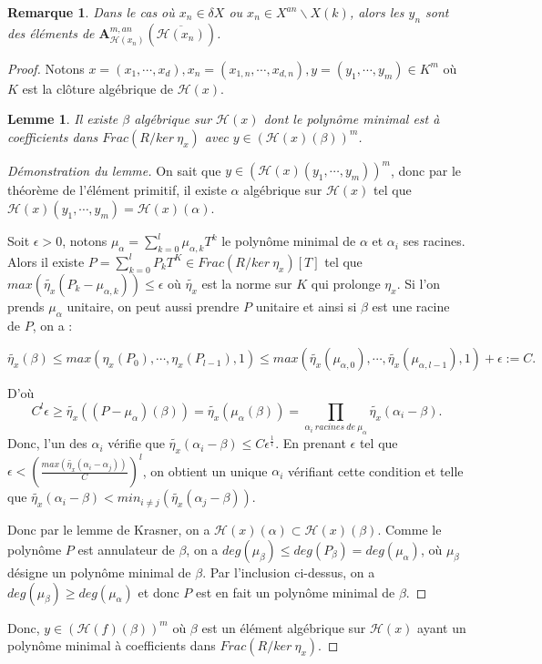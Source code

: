\documentclass[11pt]{article}
\newcommand{\ana}{\mathbf{A}}
\newtheorem{lem}[thm]{Lemme}
\newtheorem{rem}[thm]{Remarque}
\begin{document}
\begin{rem}
Dans le cas où $x_n \in \delta X$ ou $x_n \in X^{an}\backslash X(k)$, alors les $y_n$ sont des éléments de $\ana^{m,an}_{\mathcal{H}(x_n)}(\overline{\mathcal{H}(x_n)})$.
\end{rem}
\begin{proof}
Notons $x= (x_1, \cdots, x_d), x_n = (x_{1,n}, \cdots, x_{d,n}), y = (y_1, \cdots, y_m)\in K^m$ où $K$ est la clôture algébrique de $\mathcal{H}(x)$. 
\begin{lem}
Il existe $\beta$ algébrique sur $\mathcal{H}(x)$ dont le polynôme minimal est à coefficients dans $Frac(R/ker~\eta_x)$ avec $y \in (\mathcal{H}(x)(\beta))^m$.
\end{lem}
\begin{proof}[Démonstration du lemme]
On sait que $y \in (\mathcal{H}(x)(y_{1}, \cdots, y_{m}))^m$, donc par le théorème de l'élément primitif, il existe $\alpha$ algébrique sur $\mathcal{H}(x)$ tel que $\mathcal{H}(x)(y_{1}, \cdots, y_{m}) = \mathcal{H}(x)(\alpha)$.

Soit $\epsilon > 0$, notons $\mu_\alpha = \sum_{k=0}^l \mu_{\alpha,k}T^k$ le polynôme minimal de $\alpha$ et $\alpha_i$ ses racines. Alors il existe $P = \sum_{k=0}^l P_k T^K \in Frac(R/ker~\eta_x)[T]$ tel que $max(\tilde{\eta_x}(P_k - \mu_{\alpha,k})) \leq \epsilon$ où $\tilde{\eta_x}$ est la norme sur $K$ qui prolonge $\eta_x$. Si l'on prends $\mu_\alpha$ unitaire, on peut aussi prendre $P$ unitaire et ainsi si $\beta$ est une racine de $P$, on a :

\begin{equation*}
\tilde{\eta_x}(\beta) \leq max(\eta_x(P_0), \cdots, \eta_x(P_{l-1}), 1) \leq  max(\tilde{\eta_x}(\mu_{\alpha,0}), \cdots, \tilde{\eta_x}(\mu_{\alpha,l-1}), 1) +\epsilon :=C.
\end{equation*}

D'où
\begin{equation*}
C^l\epsilon \geq \tilde{\eta_x}((P-\mu_{\alpha})(\beta)) = \tilde{\eta_x}(\mu_{\alpha}(\beta)) = \prod_{\alpha_i~racines~de~\mu_\alpha} \tilde{\eta_x}(\alpha_i-\beta). 
\end{equation*}
Donc, l'un des $\alpha_i$ vérifie que $\tilde{\eta_x}(\alpha_i-\beta) \leq C \epsilon^{\frac{1}{l}}$. En prenant $\epsilon$ tel que $\epsilon < (\frac{max (\tilde{\eta_x}(\alpha_i -\alpha_j))}{C})^l$, on obtient un unique $\alpha_i$ vérifiant cette condition et telle que $\tilde{\eta_x}(\alpha_i-\beta) < min_{i\neq j}(\tilde{\eta_x}(\alpha_j-\beta))$.

Donc par le lemme de Krasner, on a $\mathcal{H}(x)(\alpha) \subset \mathcal{H}(x)(\beta)$. Comme le polynôme $P$ est annulateur de $\beta$, on a $deg(\mu_\beta) \leq deg(P_\beta) = deg(\mu_\alpha)$, où $\mu_\beta$ désigne un polynôme minimal de $\beta$. Par l'inclusion ci-dessus, on a  $deg(\mu_\beta) \geq deg(\mu_\alpha)$ et donc $P$ est en fait un polynôme minimal de $\beta$. 
\end{proof}
Donc, $y \in (\mathcal{H}(f)(\beta))^m$ où $\beta$ est un élément algébrique sur $\mathcal{H}(x)$ ayant un polynôme minimal à coefficients dans $Frac(R/ker~\eta_x)$.


\end{proof}
\end{document}
